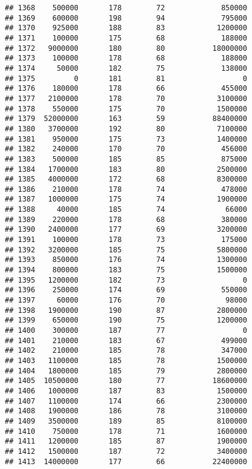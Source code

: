 \documentclass[
]{article}
\begin{document}
\begin{verbatim}
## 1368    500000       178        72             850000
## 1369    600000       198        94             795000
## 1370    925000       188        83            1200000
## 1371    100000       175        68             188000
## 1372   9000000       180        80           18000000
## 1373    100000       178        68             188000
## 1374     50000       182        75             138000
## 1375         0       181        81                  0
## 1376    180000       178        66             455000
## 1377   2100000       178        70            3100000
## 1378    550000       175        70            1500000
## 1379  52000000       163        59           88400000
## 1380   3700000       192        80            7100000
## 1381    950000       175        73            1400000
## 1382    240000       170        70             456000
## 1383    500000       185        85             875000
## 1384   1700000       183        80            2500000
## 1385   4000000       172        68            8300000
## 1386    210000       178        74             478000
## 1387   1000000       175        74            1900000
## 1388     40000       185        74              66000
## 1389    220000       178        68             380000
## 1390   2400000       177        69            3200000
## 1391    100000       178        73             175000
## 1392   3200000       185        75            5800000
## 1393    850000       176        74            1300000
## 1394    800000       183        75            1500000
## 1395   1200000       182        73                  0
## 1396    250000       174        69             550000
## 1397     60000       176        70              98000
## 1398   1900000       190        87            2800000
## 1399    650000       190        75            1200000
## 1400    300000       187        77                  0
## 1401    210000       183        67             499000
## 1402    210000       185        78             347000
## 1403   1100000       185        78            1500000
## 1404   1800000       185        79            2800000
## 1405  10500000       180        77           18600000
## 1406   1000000       187        83            1500000
## 1407   1100000       174        66            2300000
## 1408   1900000       186        78            3100000
## 1409   3500000       189        85            8100000
## 1410    750000       178        71            1600000
## 1411   1200000       185        87            1900000
## 1412   1500000       187        72            3400000
## 1413  14000000       177        66           22400000

\end{verbatim}
\end{document}

